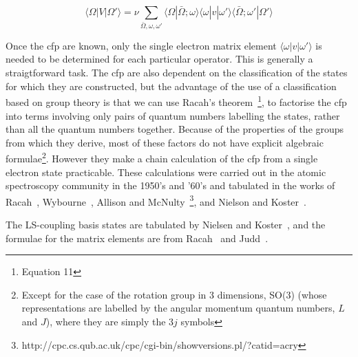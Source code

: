 \[ \langle\Omega|V|\Omega'\rangle = \nu \sum_{\bar{\Omega},\omega,\omega'} \langle\Omega|\bar{\Omega};\omega\rangle
                                         \langle\omega|v|\omega'\rangle \langle\bar{\Omega};\omega'|\Omega'\rangle \]

\noindent Once the cfp are known, only the single electron matrix element $\langle\omega|v|\omega'\rangle$ 
is needed to be determined for each particular operator. This is generally a straigtforward task. The
cfp are also dependent on the classification of the states for which they are constructed, but the
advantage of the use of a classification based on group theory is that we can use Racah's
theorem~\cite{racah49-1352}\footnote{Equation 11}, to factorise the cfp into terms involving only
pairs of quantum numbers labelling the states, rather than all the quantum numbers together. Because
of the properties of the groups from which they derive, most of these factors do not have explicit
algebraic formulae\footnote{Except for the case of the rotation group in 3 dimensions, SO(3) (whose
representations are labelled by the angular momentum quantum numbers, $L$ and $J$), where they are
simply the $3j$ symbols}. However they make a chain calculation of the cfp from a single electron
state practicable. These calculations were carried out in the atomic spectroscopy community in the
1950's and '60's and tabulated in the works of Racah~\cite{racah49-1352}, Wybourne~\cite{wybourne61}, 
Allison and McNulty~\cite{allison74}\footnote{http://cpc.cs.qub.ac.uk/cpc/cgi-bin/showversions.pl/?catid=acry},
and Nielson and Koster~\cite{nielson63-1}.

The LS-coupling basis states are tabulated by Nielsen and Koster~\cite{nielson63-1}, and the
formulae for the matrix elements are from Racah~\cite{racah42-186,racah42-438,racah43-367}
 and Judd~\cite{judd88-1}.



